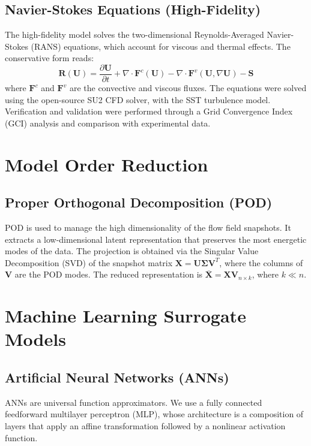\documentclass[dscexam, EN]{ufabcFHZh}
\begin{document}
\subsection{Navier-Stokes Equations (High-Fidelity)}
The high-fidelity model solves the two-dimensional Reynolds-Averaged Navier-Stokes (RANS) equations, which account for viscous and thermal effects. The conservative form reads:
\begin{equation}
  \mathbf{R}(\mathbf{U}) = \frac{\partial \mathbf{U}}{\partial t} 
  + \nabla \cdot \mathbf{F}^c(\mathbf{U}) 
  - \nabla \cdot \mathbf{F}^v(\mathbf{U}, \nabla \mathbf{U}) 
  - \mathbf{S}
\end{equation}
where $\mathbf{F}^c$ and $\mathbf{F}^v$ are the convective and viscous fluxes. The equations were solved using the open-source SU2 CFD solver, with the SST turbulence model. Verification and validation were performed through a Grid Convergence Index (GCI) analysis and comparison with experimental data.

\section{Model Order Reduction}

\subsection{Proper Orthogonal Decomposition (POD)}
POD is used to manage the high dimensionality of the flow field snapshots. It extracts a low-dimensional latent representation that preserves the most energetic modes of the data. The projection is obtained via the Singular Value Decomposition (SVD) of the snapshot matrix $\mathbf{X} = \mathbf{U} \boldsymbol{\Sigma} \mathbf{V}^T$, where the columns of $\mathbf{V}$ are the POD modes. The reduced representation is $\mathbf{\overline{X}} = \mathbf{X} \mathbf{V}_{n \times k}$, where $k \ll n$.

\section{Machine Learning Surrogate Models}

\subsection{Artificial Neural Networks (ANNs)}
ANNs are universal function approximators. We use a fully connected feedforward multilayer perceptron (MLP), whose architecture is a composition of layers that apply an affine transformation followed by a nonlinear activation function.
\end{document}
